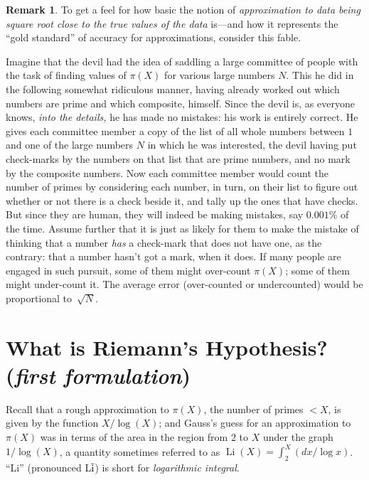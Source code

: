 \documentclass[11pt]{article}
\DeclareMathOperator{\Li}{Li}
\theoremstyle{plain}
\theoremstyle{definition}
\newtheorem{remark}[theorem]{Remark}
\numberwithin{equation}{section}
\numberwithin{figure}{section}
\numberwithin{table}{section}
\begin{document}
\begin{remark}
  To get a feel for how basic the notion of {\em approximation to data
    being square root close to the true values of the data} is---and
  how it represents the ``gold standard'' of accuracy for
  approximations, consider this fable.


  Imagine that the devil had the idea of saddling a large committee of
  people with the task of finding values of $\pi(X)$ for various large
  numbers $N$.  This he did in the following somewhat ridiculous
  manner, having already worked out which numbers are prime and which
  composite, himself. Since the devil is, as everyone knows, {\em into
    the details,} he has made no mistakes: his work is entirely
  correct.  He gives each committee member a copy of the list of all
  whole numbers between $1$ and one of the large numbers $N$ in which
  he was interested, the devil having put check-marks by the numbers
  on that list that are prime numbers, and no mark by the composite
  numbers. Now each committee member would count the number of primes
  by considering each number, in turn, on their list to figure out
  whether or not there is a check beside it, and tally up the ones
  that have checks. But since they are human, they will indeed be
  making mistakes, say $0.001\%$ of the time.  Assume further that it
  is just as likely for them to make the mistake of thinking that a
  number {\em has} a check-mark that does not have one, as the
  contrary: that a number hasn't got a mark, when it does.  If many
  people are engaged in such pursuit, some of them might over-count
  $\pi(X)$; some of them might under-count it. The average error
  (over-counted or undercounted) would be proportional to~${\sqrt N}$.

\end{remark}

\section { What is Riemann's Hypothesis?  ({\em first formulation})\label{sec:rh1}}

\bigskip 

Recall that a rough approximation to $\pi(X)$, the number of primes $<
X$,  is given by the function $X/\log(X)$; and  Gauss's guess for an
approximation to $\pi(X)$  was in terms of the area in the region
from $2$ to $X$ under the graph $1/\log(X)$, a quantity sometimes referred to
as $\Li(X) = \int_2^X (dx/\log x)$.
``Li'' (pronounced L$\overline{\rm i}$) is short for {\em logarithmic integral}.
\end{document}
